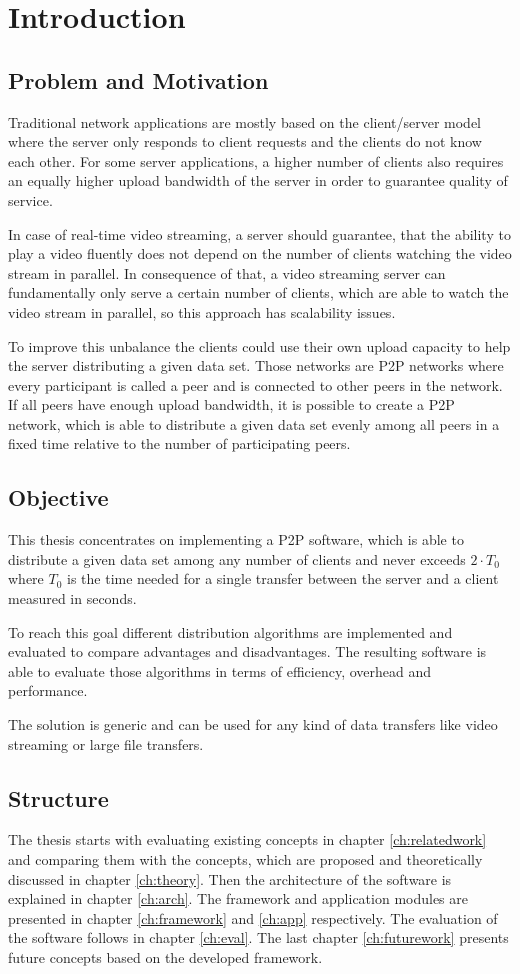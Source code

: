 \chapter{Introduction}
\section{Problem and Motivation}
Traditional network applications are mostly based on the client/server model where the server only responds to client requests and the clients do not know each other. 
For some server applications, a higher number of clients also requires an equally higher upload bandwidth of the server in order to guarantee quality of service.

In case of real-time video streaming, a server should guarantee, that the ability to play a video fluently does not depend on the number of clients watching the video stream in parallel. In consequence of that, a video streaming server can fundamentally only serve a certain number of clients, which are able to watch the video stream in parallel, so this approach has scalability issues.

To improve this unbalance the clients could use their own upload capacity to help the server distributing a given data set. Those networks are P2P networks where every participant is called a peer and is connected to other peers in the network. If all peers have enough upload bandwidth, it is possible to create a P2P network, which is able to distribute a given data set evenly among all peers in a fixed time relative to the number of participating peers.

\section{Objective}
This thesis concentrates on implementing a P2P software, which is able to distribute a given data set among any number of clients and never exceeds $2 \cdot T_0$ where $T_0$ is the time needed for a single transfer between the server and a client measured in seconds.

To reach this goal different distribution algorithms are implemented and evaluated to compare advantages and disadvantages. The resulting software is able to evaluate those algorithms in terms of efficiency, overhead and performance.

The solution is generic and can be used for any kind of data transfers like video streaming or large file transfers.

\section{Structure}
The thesis starts with evaluating existing concepts in chapter \ref{ch:relatedwork} and comparing them with the concepts, which are proposed and theoretically discussed in chapter \ref{ch:theory}. Then the architecture of the software is explained in chapter \ref{ch:arch}. The framework and application modules are presented in chapter \ref{ch:framework} and \ref{ch:app} respectively. The evaluation of the software follows in chapter \ref{ch:eval}. The last chapter \ref{ch:futurework} presents future concepts based on the developed framework.